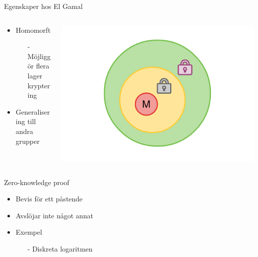 \begin{frame}{Egenskaper hos El Gamal}

\begin{columns}
	\begin{column}{0.6\textwidth}
		\begin{itemize}
			\item Homomorft
			\begin{itemize}
				\item[-] Möjliggör flera lager kryptering
			\end{itemize}
			\item Generalisering till andra grupper
		\end{itemize}
	\end{column}
	\begin{column}{0.4\textwidth}
		\includegraphics[width=\textwidth]{images/mix6.pdf}
	\end{column}
\end{columns}

\end{frame}

\begin{frame}{Zero-knowledge proof}

\begin{itemize}
\item Bevis för ett påstende
\item Avslöjar inte något annat
\item Exempel
\begin{itemize}
	\item[-] Diskreta logaritmen
\end{itemize}
\end{itemize}

\end{frame}